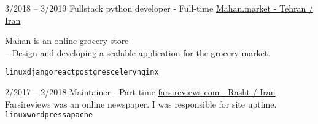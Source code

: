 \documentclass[9pt]{developercv}
\begin{document}
\begin{entrylist}
	\entry
	{3/2018 -- 3/2019}
	{Fullstack python developer - Full-time}
	{\href{https://mahan.market/}{Mahan.market - Tehran / Iran}}
	{Mahan is an online grocery store \\
		-- Design and developing a scalable application for the grocery market.

		\texttt{linux}\slashsep\texttt{django}\slashsep\texttt{react}\slashsep\texttt{postgres}\slashsep\texttt{celery}\slashsep\texttt{nginx}}
\end{entrylist}\begin{entrylist}
	\entry
	{2/2017 -- 2/2018}
	{Maintainer - Part-time}
	{\href{https://farsireviews.com/}{farsireviews.com - Rasht / Iran}}
	{Farsireviews was an online newspaper. I was responsible for site uptime. \\
		\texttt{linux}\slashsep\texttt{wordpress}\slashsep\texttt{apache}}
	\\ \\
\end{entrylist}


\end{document}
